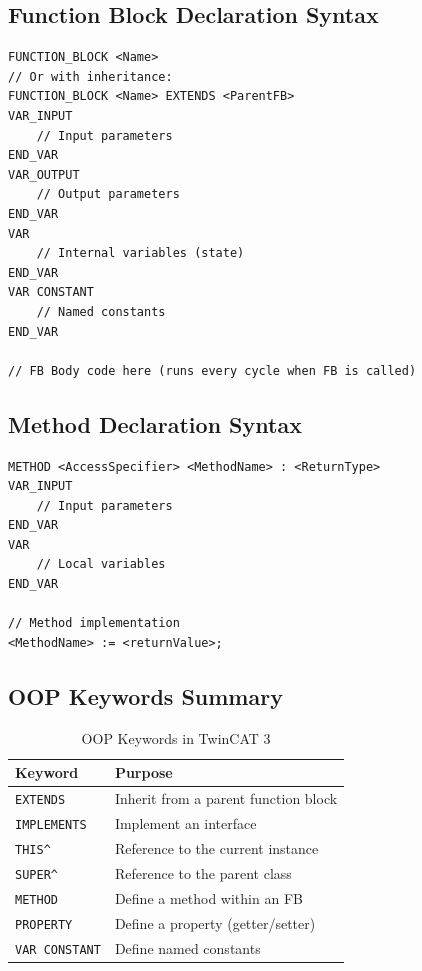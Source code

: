 \documentclass[11pt,a4paper]{article}
\begin{document}
\subsection*{Function Block Declaration Syntax}

\begin{lstlisting}
FUNCTION_BLOCK <Name>
// Or with inheritance:
FUNCTION_BLOCK <Name> EXTENDS <ParentFB>
VAR_INPUT
    // Input parameters
END_VAR
VAR_OUTPUT
    // Output parameters
END_VAR
VAR
    // Internal variables (state)
END_VAR
VAR CONSTANT
    // Named constants
END_VAR

// FB Body code here (runs every cycle when FB is called)
\end{lstlisting}

\subsection*{Method Declaration Syntax}

\begin{lstlisting}
METHOD <AccessSpecifier> <MethodName> : <ReturnType>
VAR_INPUT
    // Input parameters
END_VAR
VAR
    // Local variables
END_VAR

// Method implementation
<MethodName> := <returnValue>;
\end{lstlisting}

\subsection*{OOP Keywords Summary}

\begin{table}[h]
\centering
\begin{tabular}{@{}ll@{}}
\toprule
\textbf{Keyword} & \textbf{Purpose} \\
\midrule
\texttt{EXTENDS} & Inherit from a parent function block \\
\texttt{IMPLEMENTS} & Implement an interface \\
\texttt{THIS\^{}} & Reference to the current instance \\
\texttt{SUPER\^{}} & Reference to the parent class \\
\texttt{METHOD} & Define a method within an FB \\
\texttt{PROPERTY} & Define a property (getter/setter) \\
\texttt{VAR CONSTANT} & Define named constants \\
\bottomrule
\end{tabular}
\caption{OOP Keywords in TwinCAT 3}
\end{table}
\end{document}
